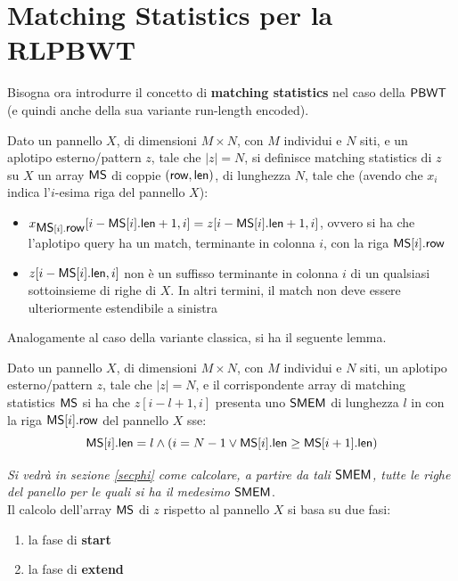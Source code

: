 \section{Matching Statistics per la RLPBWT}
Bisogna ora introdurre il 
concetto di \textbf{matching statistics} nel caso della $\mbox{\rm {\sf PBWT}}$ (e quindi
anche della sua variante run-length encoded).
\begin{definizione}
  Dato un pannello $X$, di dimensioni $M\times N$, con $M$ individui e $N$ siti,
  e un aplotipo esterno/pattern $z$, tale che $|z|=N$, si definisce matching
  statistics di $z$ su $X$ un array $\mbox{\rm {\sf MS}}$ di coppie $(\mbox{\rm {\sf row}},\mbox{\rm {\sf len}})$, di lunghezza
  $N$, tale che (avendo che $x_i$ indica l'$i$-esima riga del pannello $X$): 
  \begin{itemize}
    \item $x_{\mbox{\rm {\sf MS}}[i].\mbox{\rm {\sf row}}}[i-\mbox{\rm {\sf MS}}[i].\mbox{\rm {\sf len}}+1,i]=z[i-\mbox{\rm {\sf MS}}[i].\mbox{\rm {\sf len}}+1,i]$, ovvero si
    ha che 
    l'aplotipo query ha un match, terminante in colonna $i$, con la riga
    $\mbox{\rm {\sf MS}}[i].\mbox{\rm {\sf row}}$  
    \item $z[i-\mbox{\rm {\sf MS}}[i].\mbox{\rm {\sf len}},i]$ non è un suffisso terminante in colonna $i$ di un
    qualsiasi sottoinsieme di righe di $X$. In altri termini, il match non deve
    essere ulteriormente estendibile a sinistra
  \end{itemize}
\end{definizione}
\noindent
Analogamente al caso della variante classica, si ha il seguente lemma.
\begin{lemma}
  Dato un pannello $X$, di dimensioni $M\times N$, con $M$ individui e $N$
  siti, un aplotipo esterno/pattern $z$, tale che $|z|=N$, e il corrispondente
  array di matching statistics $\mbox{\rm {\sf MS}}$ si ha che $z[i-l+1,i]$
  presenta uno $\mbox{\rm {\sf SMEM}}$ di lunghezza $l$ in con la riga $\mbox{\rm {\sf MS}}[i].\mbox{\rm {\sf row}}$ del pannello
  $X$ sse: 
  \begin{equation}
    \label{eq:rlpbwtsmem}
    \mbox{\rm {\sf MS}}[i].\mbox{\rm {\sf len}}=l\land(i=N-1\lor \mbox{\rm {\sf MS}}[i].\mbox{\rm {\sf len}}\geq \mbox{\rm {\sf MS}}[i+1].\mbox{\rm {\sf len}})
  \end{equation}
\end{lemma}
\noindent
\textit{Si vedrà in sezione \ref{secphi} come calcolare, a partire da tali
  $\mbox{\rm {\sf SMEM}}$, tutte le righe del panello per le quali si ha il medesimo
  $\mbox{\rm {\sf SMEM}}$}.\\
Il calcolo dell'array $\mbox{\rm {\sf MS}}$ di $z$ rispetto al pannello $X$ si basa su due fasi:
\begin{enumerate}
  \item la fase di \textbf{start}
  \item la fase di \textbf{extend}
\end{enumerate}
